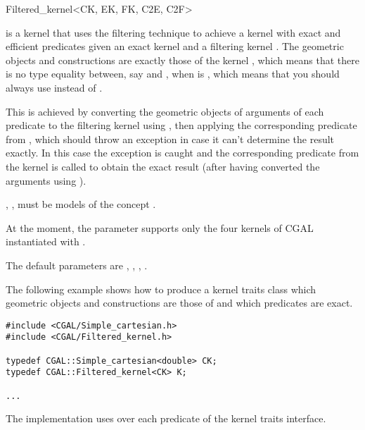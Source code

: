 \begin{ccRefClass}{Filtered_kernel<CK, EK, FK, C2E, C2F>}

\KernelRefLayout\gdef\ccTagOperatorLayout{\ccFalse}

\ccDefinition

\ccClassTemplateName is a kernel that uses the filtering technique
\cite{bbp-iayea-98} to achieve a kernel with exact and efficient predicates
given an exact kernel  and a filtering kernel .  The geometric
objects and constructions are exactly those of the kernel , which
means that there is no type equality between, say  and
, when  is \ccClassTemplateName, which means that you
should always use  instead of .

This is achieved by converting the geometric objects of  arguments of
each predicate to the filtering kernel  using , then applying
the corresponding predicate from , which should throw an exception in
case it can't determine the result exactly.  In this case the exception is
caught and the corresponding predicate from the kernel  is called to
obtain the exact result (after having converted the arguments using
).

, ,  must be models of the concept .

At the moment, the parameter  supports only the four kernels of
CGAL instantiated with .

The default parameters are ,
  ,
  ,
  .



\ccExample

The following example shows how to produce a kernel traits class  which
geometric objects and constructions are those of
 and which predicates are exact.

\begin{verbatim}
#include <CGAL/Simple_cartesian.h>
#include <CGAL/Filtered_kernel.h>

typedef CGAL::Simple_cartesian<double> CK;
typedef CGAL::Filtered_kernel<CK> K;

...
\end{verbatim}

\ccImplementation
The implementation uses  over
each predicate of the kernel traits interface.

\end{ccRefClass}
